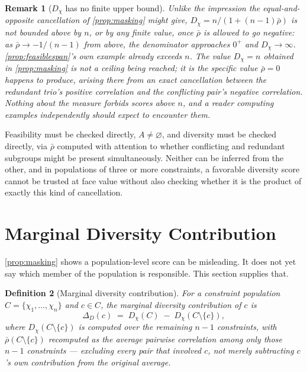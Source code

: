 \documentclass[12pt]{report}
\newtheorem{definition}{Definition}[section]
\newtheorem{remark}[definition]{Remark}
\begin{document}
\begin{remark}[$D_\chi$ has no finite upper bound]
\label{rem:no-upper-bound}
Unlike the impression the equal-and-opposite cancellation of
\cref{prop:masking} might give, $D_\chi = n/(1 + (n-1)\bar\rho)$ is not
bounded above by $n$, or by any finite value, once $\bar\rho$ is allowed
to go negative: as $\bar\rho \to -1/(n-1)$ from above, the denominator
approaches $0^+$ and $D_\chi \to \infty$. \cref{prop:feasiblespan}'s own
example already exceeds $n$. The value $D_\chi = n$ obtained in
\cref{prop:masking} is not a ceiling being reached; it is the specific
value $\bar\rho = 0$ happens to produce, arising there from an exact
cancellation between the redundant trio's positive correlation and the
conflicting pair's negative correlation. Nothing about the measure
forbids scores above $n$, and a reader computing examples independently
should expect to encounter them.
\end{remark}

Feasibility must be checked directly, $A \neq \varnothing$, and
diversity must be checked directly, via $\bar\rho$ computed with
attention to whether conflicting and redundant subgroups might be
present simultaneously. Neither can be inferred from the other, and in
populations of three or more constraints, a favorable diversity score
cannot be trusted at face value without also checking whether it is the
product of exactly this kind of cancellation.

\section{Marginal Diversity Contribution}
\label{sec:marginal}

\cref{prop:masking} shows a population-level score can be misleading.
It does not yet say which member of the population is responsible. This
section supplies that.

\begin{definition}[Marginal diversity contribution]
\label{def:marginal-diversity}
For a constraint population $C = \{\chi_1,\ldots,\chi_n\}$ and $c \in
C$, the marginal diversity contribution of $c$ is
\[
\Delta_D(c) \;=\; D_\chi(C) \;-\; D_\chi(C \setminus \{c\}),
\]
where $D_\chi(C \setminus \{c\})$ is computed over the remaining $n-1$
constraints, with $\bar\rho(C \setminus \{c\})$ recomputed as the
average pairwise correlation among only those $n-1$ constraints ---
excluding every pair that involved $c$, not merely subtracting $c$'s own
contribution from the original average.
\end{definition}
\end{document}
